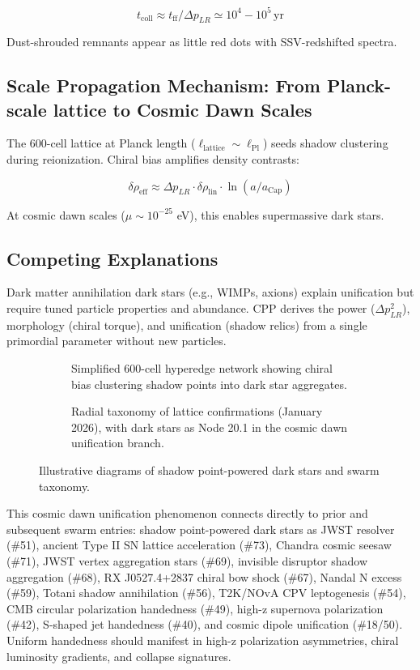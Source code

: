 \documentclass[11pt]{article}
\begin{document}
\[
t_{\text{coll}} \approx t_{\text{ff}} / \Delta p_{LR} \simeq 10^4 - 10^5 \, \text{yr}
\]

Dust-shrouded remnants appear as little red dots with SSV-redshifted spectra.

\subsection{Scale Propagation Mechanism: From Planck-scale lattice to Cosmic Dawn Scales}
The 600-cell lattice at Planck length ($\ell_{\text{lattice}} \sim \ell_{\text{Pl}}$) seeds shadow clustering during reionization. Chiral bias amplifies density contrasts:

\[
\delta \rho_{\text{eff}} \approx \Delta p_{LR} \cdot \delta \rho_{\text{lin}} \cdot \ln(a / a_{\text{Cap}})
\]

At cosmic dawn scales ($\mu \sim 10^{-25}$ eV), this enables supermassive dark stars.

\subsection{Competing Explanations}
Dark matter annihilation dark stars (e.g., WIMPs, axions) explain unification but require tuned particle properties and abundance. CPP derives the power ($\Delta p_{LR}^2$), morphology (chiral torque), and unification (shadow relics) from a single primordial parameter without new particles.

\begin{figure}[htbp]
\centering
\begin{subfigure}{0.45\textwidth}
\centering
\caption{Simplified 600-cell hyperedge network showing chiral bias clustering shadow points into dark star aggregates.}
\label{fig:shadow-darkstar}
\end{subfigure}
\hfill
\begin{subfigure}{0.45\textwidth}
\centering
\caption{Radial taxonomy of lattice confirmations (January 2026), with dark stars as Node 20.1 in the cosmic dawn unification branch.}
\label{fig:taxonomy}
\end{subfigure}
\caption{Illustrative diagrams of shadow point-powered dark stars and swarm taxonomy.}
\end{figure}

This cosmic dawn unification phenomenon connects directly to prior and subsequent swarm entries: shadow point-powered dark stars as JWST resolver (\#51), ancient Type II SN lattice acceleration (\#73), Chandra cosmic seesaw (\#71), JWST vertex aggregation stars (\#69), invisible disruptor shadow aggregation (\#68), RX J0527.4+2837 chiral bow shock (\#67), Nandal N excess (\#59), Totani shadow annihilation (\#56), T2K/NOvA CPV leptogenesis (\#54), CMB circular polarization handedness (\#49), high-z supernova polarization (\#42), S-shaped jet handedness (\#40), and cosmic dipole unification (\#18/50). Uniform handedness should manifest in high-z polarization asymmetries, chiral luminosity gradients, and collapse signatures.
\end{document}
